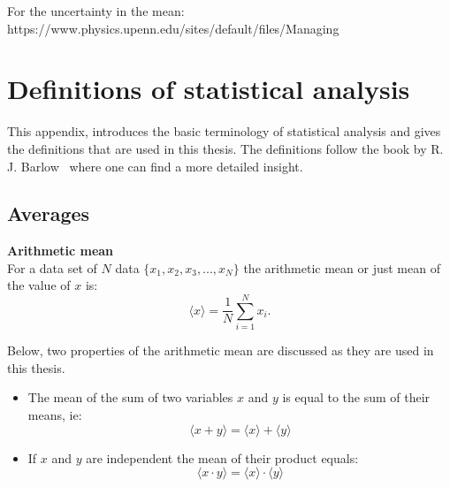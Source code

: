 For the uncertainty in the mean:
https://www.physics.upenn.edu/sites/default/files/Managing%

\section{Definitions of statistical analysis}\label{app:statistics_definitions}
This appendix, introduces the basic terminology of statistical analysis and gives the definitions that are used in this thesis. The definitions follow the book by R. J. Barlow~\cite{lvp.b313005720130101} where one can find a more detailed insight.

\subsection{Averages}
\normalsize{\textbf{Arithmetic mean}}\\
For a data set of $N$ data $\{ x_1, x_2, x_3, ..., x_N \}$ the arithmetic mean or just mean of the value of $x$ is:
\begin{equation}\label{eq:mean_def}
    \langle x \rangle = \frac{1}{N} \sum_{i=1}^{N} x_i.
\end{equation}

Below, two properties of the arithmetic mean are discussed as they are used in this thesis.
\begin{itemize}
    \item The mean of the sum of two variables $x$ and $y$ is equal to the sum of their means, ie:
    \begin{equation}\label{eq:mean_of_sum_property}
        \langle x+y \rangle = \langle x \rangle + \langle y \rangle
    \end{equation}
    \item If $x$ and $y$ are independent the mean of their product equals:
    \begin{equation}\label{eq:mean_of_product_property}
        \langle x \cdot y \rangle = \langle x \rangle \cdot  \langle y \rangle
    \end{equation}
\end{itemize}



